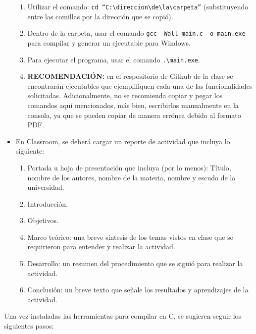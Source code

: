 \documentclass[10pt,letterpaper]{article}
\begin{document}
\begin{itemize}
\begin{enumerate}
        \item Utilizar el comando: \texttt{cd ``C:\textbackslash direccion\textbackslash de\textbackslash la\textbackslash carpeta''} (substituyendo entre las comillas por la dirección que se copió).
        \item Dentro de la carpeta, usar el comando \texttt{gcc -Wall main.c -o main.exe} para compilar y generar un ejecutable para Windows.
        \item Para ejecutar el programa, usar el comando \texttt{.\textbackslash main.exe}.
        \item \textbf{RECOMENDACIÓN:} en el respositorio de Github de la clase se encontrarán ejecutables que ejemplifiquen cada una de las funcionalidades solicitadas. Adicionalmente, no se recomienda copiar y pegar los comandos aquí mencionados, más bien, escribirlos manualmente en la consola, ya que se pueden copiar de manera errónea debido al formato PDF.
    \end{enumerate}
    \item En Classroom, se deberá cargar un reporte de actividad que incluya lo siguiente:
    \begin{enumerate}%
        \item Portada u hoja de presentación que incluya (por lo menos): Título, nombre de los autores, nombre de la materia, nombre y escudo de la universidad.
        \item Introducción.
        \item Objetivos.
        \item Marco teórico: una breve síntesis de los temas vistos en clase que se requirieron para entender y realizar la actividad.
        \item Desarrollo: un resumen del procedimiento que se siguió para realizar la actividad.
        \item Conclusión: un breve texto que señale los resultados y aprendizajes de la actividad.
    \end{enumerate}
\end{itemize}
Una vez instaladas las herramientas para compilar en C, se sugieren seguir los siguientes pasos:
\end{document}
